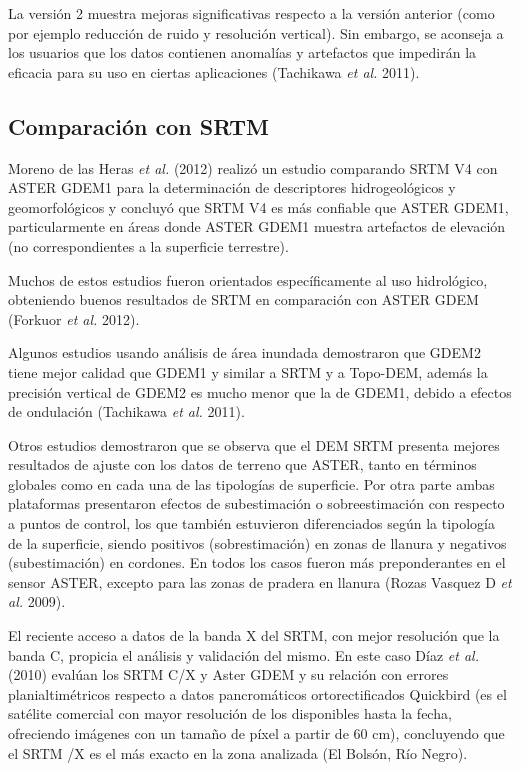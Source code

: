 \documentclass[10pt,a4paper, twoside]{report}
\begin{document}
La versión 2 muestra mejoras significativas respecto a la versión anterior (como por ejemplo reducción de ruido y resolución vertical). Sin embargo, se aconseja a los usuarios que los datos contienen anomalías y artefactos que impedirán la eficacia para su uso en ciertas aplicaciones (Tachikawa \textit{et al.} 2011).

\subsection{Comparación con SRTM}

Moreno de las Heras \textit{et al.} (2012) realizó un estudio comparando SRTM V4 con ASTER GDEM1 para la determinación de descriptores hidrogeológicos y geomorfológicos y concluyó que SRTM V4 es más confiable que ASTER GDEM1, particularmente en áreas donde ASTER GDEM1 muestra artefactos de elevación (no correspondientes a la superficie terrestre).

Muchos de estos estudios fueron orientados específicamente al uso hidrológico, obteniendo buenos resultados de SRTM en comparación con ASTER GDEM (Forkuor \textit{et al.} 2012).

Algunos estudios usando análisis de área inundada demostraron que GDEM2 tiene mejor calidad que GDEM1 y similar a SRTM y a Topo-DEM, además la precisión vertical de GDEM2 es mucho menor que la de GDEM1, debido a efectos de ondulación (Tachikawa \textit{et al.} 2011).

Otros estudios demostraron que se observa que el DEM SRTM presenta mejores resultados de ajuste con los datos de terreno que ASTER, tanto en términos globales como en cada una de las tipologías de superficie. Por otra parte ambas plataformas presentaron efectos de subestimación o sobreestimación con respecto a puntos de control, los que también estuvieron diferenciados según la tipología de la superficie, siendo positivos (sobrestimación) en zonas de llanura y negativos (subestimación) en cordones. En todos los casos fueron más preponderantes en el sensor ASTER, excepto para las zonas de pradera en llanura (Rozas Vasquez D \textit{et al.} 2009).

El reciente acceso a datos de la banda X del SRTM, con mejor resolución que la banda C, propicia el análisis y validación del mismo. En este caso Díaz \textit{et al.} (2010) evalúan los SRTM C/X y Aster GDEM y su relación con errores planialtimétricos respecto a datos pancromáticos ortorectificados Quickbird (es el satélite comercial con mayor resolución de los disponibles hasta la fecha, ofreciendo imágenes con un tamaño de píxel a partir de 60 cm), concluyendo que el SRTM /X es el más exacto en la zona analizada (El Bolsón, Río Negro). 
\end{document}
